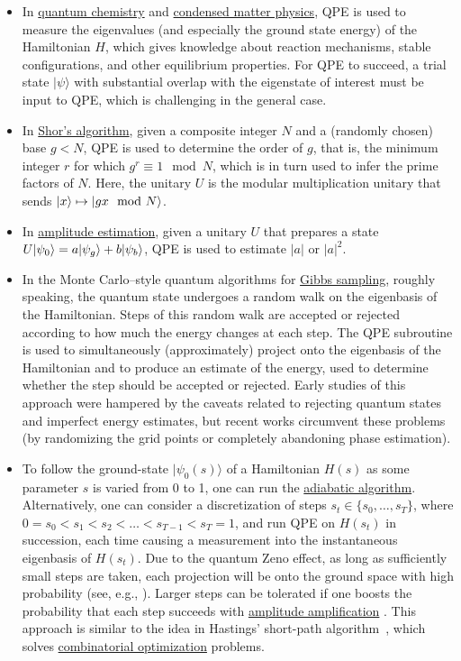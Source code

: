 \begin{refsection}
\begin{itemize}
    \item In \hyperref[appl:QuantumChemistry]{quantum chemistry} and \hyperref[appl:CondensedMatter]{condensed matter physics}, QPE is used to measure the eigenvalues (and especially the ground state energy) of the Hamiltonian $H$, which gives knowledge about reaction mechanisms, stable configurations, and other equilibrium properties. For QPE to succeed, a trial state $|\psi\rangle$ with substantial overlap with the eigenstate of interest must be input to QPE, which is challenging in the general case.
    \item In \hyperref[appl:BreakingCrypto]{Shor's algorithm}, given a composite integer $N$ and a (randomly chosen) base $g < N$, QPE is used to determine the order of $g$, that is, the minimum integer $r$ for which $g^r \equiv 1 \mod N$, which is in turn used to infer the prime factors of $N$.  Here, the unitary $U$ is the modular multiplication unitary that sends $\lvert x\rangle \mapsto \lvert gx \mod N\rangle$. 
    \item In \hyperref[prim:AmpEst]{amplitude estimation}, given a unitary $U$ that prepares a state $U\lvert\psi_0\rangle = a\lvert\psi_g\rangle + b\lvert\psi_b\rangle$, QPE is used to estimate $|a|$ or $|a|^2$. 
    \item In the Monte Carlo--style quantum algorithms for \hyperref[prim:GibbsSampling]{Gibbs sampling}, roughly speaking, the quantum state undergoes a random walk on the eigenbasis of the Hamiltonian. Steps of this random walk are accepted or rejected according to how much the energy changes at each step. The QPE subroutine is used to simultaneously (approximately) project onto the eigenbasis of the Hamiltonian and to produce an estimate of the energy, used to determine whether the step should be accepted or rejected. Early studies \cite{temme2011quantumMetropolis,yung2010QuantumQuantumMetropolis, wocjan2021Szegedy} of this approach were hampered by the caveats related to rejecting quantum states and imperfect energy estimates, but recent works \cite{Rall_thermal_22,chen2023QThermalStatePrep} circumvent these problems (by randomizing the grid points or completely abandoning phase estimation).
    \item To follow the ground-state $|\psi_0(s)\rangle$ of a Hamiltonian $H(s)$ as some parameter $s$ is varied from 0 to 1, one can run the \hyperref[prim:QuantumAdiabaticAlgorithm]{adiabatic algorithm}. Alternatively, one can consider a discretization of steps $s_t \in \{s_0,\ldots,s_T\}$, where $0=s_0<s_1<s_2<\ldots<s_{T-1}<s_T=1$, and run QPE on $H(s_t)$ in succession, each time causing a measurement into the instantaneous eigenbasis of $H(s_t)$. Due to the quantum Zeno effect, as long as sufficiently small steps are taken, each projection will be onto the ground space with high probability (see, e.g., \cite{somma2007QuantumSimulatedAnnealing}). Larger steps can be tolerated if one boosts the probability that each step succeeds with \hyperref[prim:AmpAmp]{amplitude amplification} \cite{boixo2010FastQuantumAlgorithms}. This approach is similar to the idea in Hastings’ short-path algorithm~\cite{hastings2018ShortPathQuantum,dalzell2022mindthegap}, which solves \hyperref[appl:CombOpt]{combinatorial optimization} problems. 

\end{itemize}
\end{refsection}
